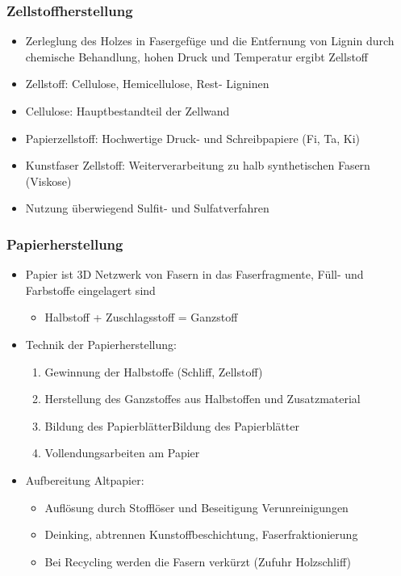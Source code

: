 \documentclass{article}
\begin{document}
\subsubsection{Zellstoffherstellung}
\begin{itemize}
  \item Zerleglung des Holzes in Fasergefüge und die Entfernung von Lignin
  durch chemische Behandlung, hohen Druck und Temperatur ergibt Zellstoff
  \item Zellstoff: Cellulose, Hemicellulose, Rest- Ligninen
  \item Cellulose: Hauptbestandteil der Zellwand
  \item Papierzellstoff: Hochwertige Druck- und Schreibpapiere (Fi, Ta, Ki)
  \item Kunstfaser Zellstoff: Weiterverarbeitung zu halb synthetischen Fasern
  (Viskose)
  \item Nutzung überwiegend Sulfit- und Sulfatverfahren
\end{itemize}

\subsubsection{Papierherstellung}
\begin{itemize}
  \item Papier ist 3D Netzwerk von Fasern in das Faserfragmente, Füll- und
  Farbstoffe eingelagert sind
  \begin{itemize}
    \item Halbstoff  + Zuschlagsstoff = Ganzstoff
  \end{itemize}
  \item Technik der Papierherstellung:
  \begin{enumerate}
    \item Gewinnung der Halbstoffe (Schliff, Zellstoff) 
    \item Herstellung des Ganzstoffes aus Halbstoffen und Zusatzmaterial
    \item Bildung des PapierblätterBildung des Papierblätter
    \item Vollendungsarbeiten am Papier
  \end{enumerate}
  \item Aufbereitung Altpapier:
  \begin{itemize}
    \item Auflösung durch Stofflöser und Beseitigung Verunreinigungen
    \item Deinking, abtrennen Kunstoffbeschichtung, Faserfraktionierung
    \item Bei Recycling werden die Fasern verkürzt (Zufuhr Holzschliff)
  \end{itemize} 
\end{itemize}
\end{document}
